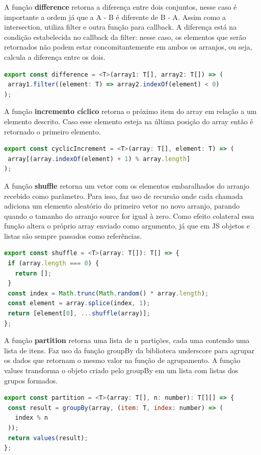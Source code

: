 \documentclass[rel_mlp]{iiufrgs}
\begin{document}
A função \textbf{difference} retorna a diferença entre dois conjuntos, nesse caso é importante a ordem já que a A - B é diferente de B - A. Assim como a intersection, utiliza filter e outra função para callback. A diferença está na condição estabelecida no callback da filter: nesse caso, os elementos que serão retornados não podem estar concomitantemente em ambos os arranjos, ou seja, calcula a diferença entre os dois.
\begin{lstlisting}[language = JavaScript]
export const difference = <T>(array1: T[], array2: T[]) => (
 array1.filter((element: T) => array2.indexOf(element) < 0)
);
\end{lstlisting}

A função \textbf{incremento cíclico} retorna o próximo item do array em relação a um elemento descrito. Caso esse elemento esteja na última posição do array então é retornado o primeiro elemento.
\begin{lstlisting}[language = JavaScript]
export const cyclicIncrement = <T>(array: T[], element: T) => (
 array[(array.indexOf(element) + 1) % array.length]
);
\end{lstlisting}

A função \textbf{shuffle} retorna um vetor com os elementos embaralhados do arranjo recebido como parâmetro. Para isso, faz uso de recursão onde cada chamada adiciona um elemento aleatório do primeiro vetor no novo arranjo, parando quando o tamanho do arranjo source for igual à zero. Como efeito colateral essa função altera o próprio array enviado como argumento, já que em JS objetos e listas são sempre passados como referências.
\begin{lstlisting}[language = JavaScript]
export const shuffle = <T>(array: T[]): T[] => {
 if (array.length === 0) {
   return [];
 }
 const index = Math.trunc(Math.random() * array.length);
 const element = array.splice(index, 1);
 return [element[0], ...shuffle(array)];
};
\end{lstlisting}

A função \textbf{partition} retorna uma lista de n partições, cada uma contendo uma lista de itens. Faz uso da função groupBy da biblioteca underscore para agrupar os dados que retornam o mesmo valor na função de agrupamento. A função values transforma o objeto criado pelo groupBy em um lista com listas dos grupos formados.
\begin{lstlisting}[language = JavaScript]
export const partition = <T>(array: T[], n: number): T[][] => {
 const result = groupBy(array, (item: T, index: number) => (
   index % n
 ));
 return values(result);
};
\end{lstlisting}
\end{document}
